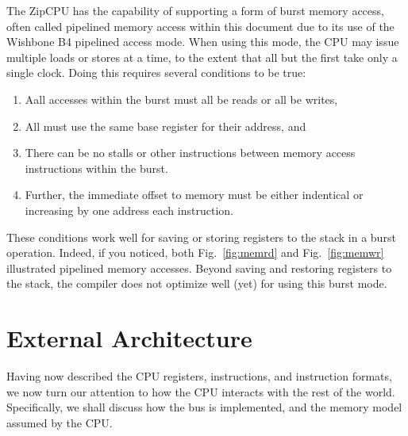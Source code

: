 \documentclass{gqtekspec}
\begin{document}
\begin{itemize}
The ZipCPU has the capability of supporting a form of burst memory access,
often called pipelined memory access within this document due to its use of
the Wishbone B4 pipelined access mode.
When using this mode, the CPU may issue multiple loads or stores at a time,
to the extent that all but the first take only a single clock.  Doing this
requires several conditions to be true:
\begin{enumerate}
\item Aall accesses within the burst must all be reads or all be writes,
\item All must use the same base register for their address, and
\item There can be no stalls or other instructions between memory access instructions within the burst. 
\item Further, the immediate offset to memory must be either indentical or
	increasing by one address each instruction. 
\end{enumerate}
These conditions work well for saving or storing registers to the stack in a 
burst operation.  Indeed, if you noticed, both Fig.~\ref{fig:memrd} and
Fig.~\ref{fig:memwr} illustrated pipelined memory accesses.  Beyond saving and
restoring registers to the stack, the compiler does not optimize well (yet)
for using this burst mode.

\end{itemize}


\section{External Architecture}

Having now described the CPU registers, instructions, and instruction formats,
we now turn our attention to how the CPU interacts with the rest of the world.
Specifically, we shall discuss how the bus is implemented, and the memory
model assumed by the CPU.
\end{document}

